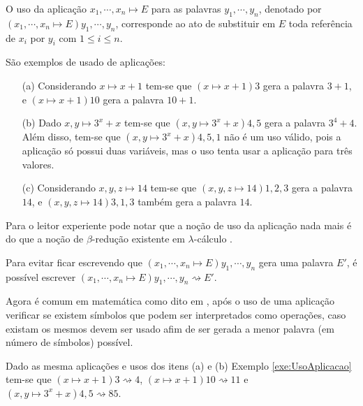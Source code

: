 \begin{definition}\label{def:UsoAplicacao}
	O uso da aplicação $x_1, \cdots, x_n \mapsto E$ para as palavras $y_1, \cdots, y_n$, denotado por $(x_1, \cdots, x_n \mapsto E)y_1, \cdots, y_n$, corresponde ao ato de substituir em $E$ toda referência de $x_i$ por $y_i$ com $1 \leq i \leq n$.
\end{definition}

\begin{example}\label{exe:UsoAplicacao}
	São exemplos de usado de aplicações:
	\begin{itemize}
		\item[(a)] Considerando $x \mapsto x + 1$ tem-se que $(x \mapsto x + 1)3$ gera a palavra $3 + 1$, e $(x \mapsto x + 1)10$ gera a palavra $10 + 1$.
		\item[(b)] Dado $x, y \mapsto 3^x + x$ tem-se que $(x, y \mapsto 3^x + x)4,5$ gera a palavra $3^4 + 4$. Além disso,  tem-se que $(x, y \mapsto 3^x + x)4,5,1$ não é um uso válido, pois a aplicação só possui duas variáveis, mas o uso tenta usar a aplicação para três valores.
		\item[(c)] Considerando $x, y, z \mapsto 14$ tem-se que $(x, y, z \mapsto 14)1, 2, 3$ gera a palavra $14$, e $(x, y, z \mapsto 14)3, 1, 3$ também gera a palavra $14$.
	\end{itemize}
\end{example}

Para o leitor experiente pode notar que a noção de uso da aplicação nada mais é do que a noção de $\beta$-redução existente em $\lambda$-cálculo \cite{bare1984}. 

\begin{remark}\label{rema:ReducaoFuncao}
	Para evitar ficar escrevendo que $(x_1, \cdots, x_n \mapsto E)y_1, \cdots, y_n$ gera uma palavra $E'$, é possível escrever $(x_1, \cdots, x_n \mapsto E)y_1, \cdots, y_n \rightsquigarrow E'$.
\end{remark}

Agora é comum em matemática como dito em \cite{carmo2013}, após o uso de uma aplicação verificar se existem símbolos que podem ser interpretados como operações, caso existam os mesmos devem ser usado afim de ser gerada a menor palavra (em número de símbolos) possível.

\begin{example}
	Dado as mesma aplicações e usos dos itens (a) e (b) Exemplo \ref{exe:UsoAplicacao} tem-se que $(x \mapsto x + 1)3 \rightsquigarrow 4$, $(x \mapsto x + 1)10 \rightsquigarrow 11$ e $(x, y \mapsto 3^x + x)4,5 \rightsquigarrow 85$.
\end{example}

